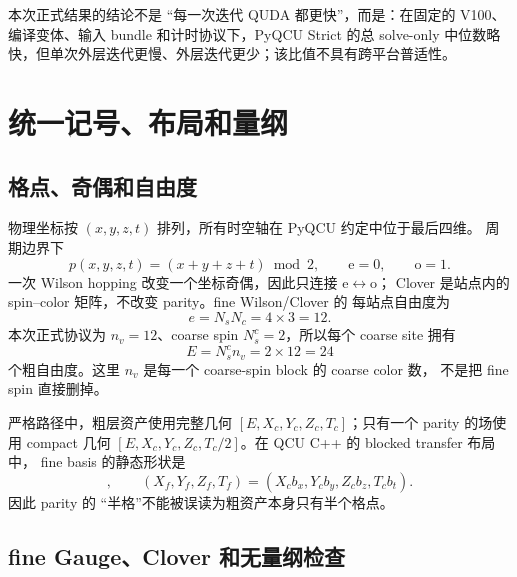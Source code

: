 \documentclass[UTF8,a4paper,11pt]{ctexart}
\newcommand{\odd}{\mathrm o}
\newcommand{\even}{\mathrm e}
\begin{document}
本次正式结果的结论不是 ``每一次迭代 QUDA 都更快''，而是：在固定的
V100、编译变体、输入 bundle 和计时协议下，PyQCU Strict 的总 solve-only
中位数略快，但单次外层迭代更慢、外层迭代更少；该比值不具有跨平台普适性。

\section{统一记号、布局和量纲}

\subsection{格点、奇偶和自由度}

物理坐标按 $(x,y,z,t)$ 排列，所有时空轴在 PyQCU 约定中位于最后四维。
周期边界下
\begin{equation}
 p(x,y,z,t)=(x+y+z+t)\bmod 2,
 \qquad \even=0,\qquad \odd=1 .
 \label{eq:parity}
\end{equation}
一次 Wilson hopping 改变一个坐标奇偶，因此只连接 $\even\leftrightarrow\odd$；
Clover 是站点内的 spin--color 矩阵，不改变 parity。fine Wilson/Clover 的
每站点自由度为
\begin{equation}
 e=N_sN_c=4\times3=12.
 \label{eq:fine-dof}
\end{equation}
本次正式协议为 $n_v=12$、coarse spin $N_s^c=2$，所以每个 coarse site
拥有
\begin{equation}
 E=N_s^c n_v=2\times12=24
 \label{eq:coarse-dof}
\end{equation}
个粗自由度。这里 $n_v$ 是每一个 coarse-spin block 的 coarse color 数，
不是把 fine spin 直接删掉。

严格路径中，粗层资产使用完整几何
$[E,X_c,Y_c,Z_c,T_c]$；只有一个 parity 的场使用 compact 几何
$[E,X_c,Y_c,Z_c,T_c/2]$。在 QCU C++ 的 blocked transfer 布局中，
fine basis 的静态形状是
\begin{equation}
 [E,e,X_c,b_x,Y_c,b_y,Z_c,b_z,T_c,b_t],
 \qquad (X_f,Y_f,Z_f,T_f)=(X_cb_x,Y_cb_y,Z_cb_z,T_cb_t).
 \label{eq:blocked-layout}
\end{equation}
因此 parity 的 ``半格''不能被误读为粗资产本身只有半个格点。

\subsection{fine Gauge、Clover 和无量纲检查}
\end{document}

